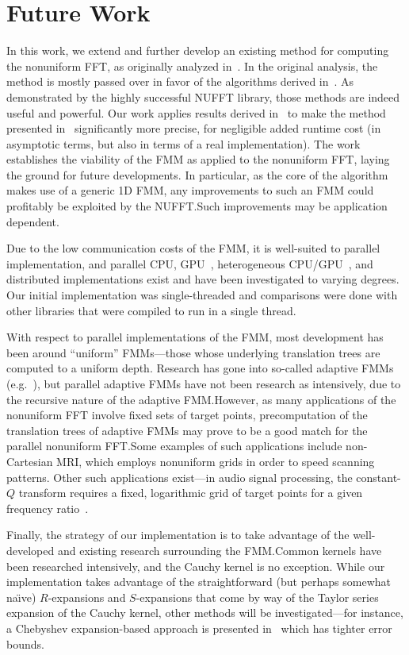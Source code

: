 \section{Future Work}

In this work, we extend and further develop an existing method for
computing the nonuniform FFT, as originally analyzed
in~\cite{Dutt95fastfourierII}. In the original analysis, the method is
mostly passed over in favor of the algorithms derived
in~\cite{dutt-rokhlin-nufft-I}. As demonstrated by the highly
successful NUFFT library, those methods are indeed useful and
powerful. Our work applies results derived in~\cite{periodic-sums} to
make the method presented in~\cite{Dutt95fastfourierII} significantly
more precise, for negligible added runtime cost (in asymptotic terms,
but also in terms of a real implementation). The work establishes the
viability of the FMM as applied to the nonuniform FFT, laying the
ground for future developments. In particular, as the core of the
algorithm makes use of a generic 1D FMM, any improvements to such an
FMM could profitably be exploited by the NUFFT.\@ Such improvements
may be application dependent.

Due to the low communication costs of the FMM, it is well-suited to
parallel implementation, and parallel CPU, GPU~\cite{gumerov2008fast},
heterogeneous CPU/GPU~\cite{qi-hu-thesis}, and distributed
implementations exist and have been investigated to varying
degrees. Our initial implementation was single-threaded and
comparisons were done with other libraries that were compiled to run
in a single thread.

With respect to parallel implementations of the FMM, most development
has been around ``uniform'' FMMs---those whose underlying translation
trees are computed to a uniform depth. Research has gone into
so-called adaptive FMMs (e.g.~\cite{fmm-helmholtz, adaptive-fmm}), but
parallel adaptive FMMs have not been research as intensively, due to
the recursive nature of the adaptive FMM.\@ However, as many
applications of the nonuniform FFT involve fixed sets of target
points, precomputation of the translation trees of adaptive FMMs may
prove to be a good match for the parallel nonuniform FFT.\@ Some
examples of such applications include non-Cartesian MRI, which employs
nonuniform grids in order to speed scanning patterns. Other such
applications exist---in audio signal processing, the constant-$Q$
transform requires a fixed, logarithmic grid of target points for a
given frequency ratio~\cite{constant-q}.

Finally, the strategy of our implementation is to take advantage of
the well-developed and existing research surrounding the FMM.\@ Common
kernels have been researched intensively, and the Cauchy kernel is no
exception. While our implementation takes advantage of the
straightforward (but perhaps somewhat na\"{\i}ve) $R$-expansions and
$S$-expansions that come by way of the Taylor series expansion of the
Cauchy kernel, other methods will be investigated---for instance, a
Chebyshev expansion-based approach is presented in~\cite{dutt1996fast}
which has tighter error bounds.



